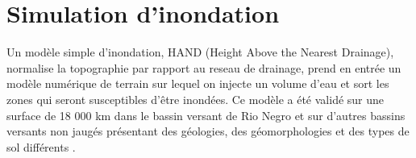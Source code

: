 \section{Simulation d'inondation}
Un modèle simple d'inondation, HAND (Height Above the Nearest Drainage),  normalise la topographie par rapport au reseau de drainage, prend en entrée un modèle numérique de terrain sur lequel on injecte un volume d'eau et sort les zones qui seront susceptibles d'être inondées. Ce modèle a été valid\'e sur une surface de 18 000 km dans le bassin versant de Rio Negro et sur d'autres bassins versants non jaugés  présentant des géologies, des géomorphologies et des types de sol différents \cite{nobre_height_2011}. 